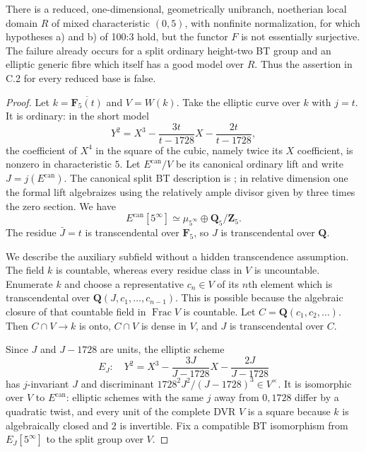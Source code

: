 \begin{theorem}
\label{thm:C-RD11}
There is a reduced, one-dimensional, geometrically unibranch,
noetherian local domain $R$ of mixed characteristic $(0,5)$, with
nonfinite normalization, for which hypotheses a) and b) of 100:3
hold, but the functor $F$ is not essentially surjective.
The failure already occurs for a split ordinary height-two BT group
and an elliptic generic fibre which itself has a good model over $R$.
Thus the assertion in C.2 for every reduced base is false.
\end{theorem}
\begin{proof}
Let $k=\overline{\mathbf F_5(t)}$ and $V=W(k)$.
Take the elliptic curve over $k$ with $j=t$. It is ordinary: in the
short model
\[
 Y^2=X^3-\frac{3t}{t-1728}X-\frac{2t}{t-1728},
\]
the coefficient of $X^4$ in the square of the cubic, namely twice
its $X$ coefficient, is nonzero in characteristic $5$.
Let $E^{\mathrm{can}}/V$ be its canonical ordinary lift and write
$J=j(E^{\mathrm{can}})$. The canonical split BT description is
\cite[Theorem~2.1]{Katz1981SerreTate}; in relative dimension one the
formal lift algebraizes using the relatively ample divisor given by
three times the zero section. We have
\[
 E^{\mathrm{can}}[5^\infty]\simeq
 \mu_{5^\infty}\oplus\mathbf Q_5/\mathbf Z_5.
\]
The residue $\bar J=t$ is transcendental over $\mathbf F_5$, so
$J$ is transcendental over $\mathbf Q$.

We describe the auxiliary subfield without a hidden transcendence
assumption. The field $k$ is countable, whereas every residue class
in $V$ is uncountable. Enumerate $k$ and choose a representative
$c_n\in V$ of its $n$th element which is transcendental over
$\mathbf Q(J,c_1,\ldots,c_{n-1})$. This is possible because the
algebraic closure of that countable field in $\operatorname{Frac}V$
is countable. Let $C=\mathbf Q(c_1,c_2,\ldots)$. Then $C\cap V\to k$
is onto, $C\cap V$ is dense in $V$, and $J$ is transcendental over $C$.

Since $J$ and $J-1728$ are units, the elliptic scheme
\[
 E_J:\quad Y^2=X^3-\frac{3J}{J-1728}X
                         -\frac{2J}{J-1728}             \tag{C-RD11.3}
\]
has $j$-invariant $J$ and discriminant
$1728^2J^2/(J-1728)^3\in V^\times$.
It is isomorphic over $V$ to $E^{\mathrm{can}}$: elliptic schemes
with the same $j$ away from $0,1728$ differ by a quadratic twist, and
every unit of the complete DVR $V$ is a square because $k$ is
algebraically closed and $2$ is invertible. Fix a compatible BT
isomorphism from $E_J[5^\infty]$ to the split group over $V$.


\end{proof}
